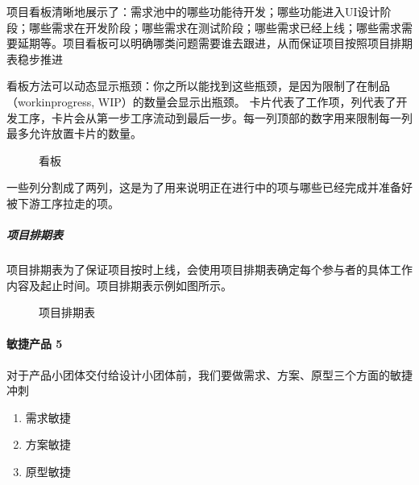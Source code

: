 \documentclass[letterpaper,11pt,english]{sphinxmanual}
\begin{document}
项目看板清晰地展示了：需求池中的哪些功能待开发；哪些功能进入UI设计阶段；哪些需求在开发阶段；哪些需求在测试阶段；哪些需求已经上线；哪些需求需要延期等。项目看板可以明确哪类问题需要谁去跟进，从而保证项目按照项目排期表稳步推进

看板方法可以动态显示瓶颈：你之所以能找到这些瓶颈，是因为限制了在制品（work\sphinxhyphen{}in\sphinxhyphen{}progress,
WIP）的数量会显示出瓶颈。
卡片代表了工作项，列代表了开发工序，卡片会从第一步工序流动到最后一步。每一列顶部的数字用来限制每一列最多允许放置卡片的数量。

\begin{figure}[H]
\centering
\capstart

\noindent{}
\caption{看板}\label{\detokenize{chapter_project/Scrum:id15}}\end{figure}

一些列分割成了两列，这是为了用来说明正在进行中的项与哪些已经完成并准备好被下游工序拉走的项。


\subparagraph{项目排期表}
\label{\detokenize{chapter_project/Scrum:id12}}
项目排期表为了保证项目按时上线，会使用项目排期表确定每个参与者的具体工作内容及起止时间。项目排期表示例如图所示。

\begin{figure}[H]
\centering
\capstart

\noindent{}
\caption{项目排期表}\label{\detokenize{chapter_project/Scrum:id16}}\end{figure}


\paragraph{敏捷产品 5\sphinxfootnotemark[280]}
\label{\detokenize{chapter_project/Scrum:id13}}%
\begin{footnotetext}[280]\sphinxAtStartFootnote
{}
%
\end{footnotetext}\ignorespaces 
对于产品小团体交付给设计小团体前，我们要做需求、方案、原型三个方面的敏捷冲刺
\begin{enumerate}
%
\item {} 
需求敏捷

\item {} 
方案敏捷

\item {} 
原型敏捷

\end{enumerate}
\end{document}
